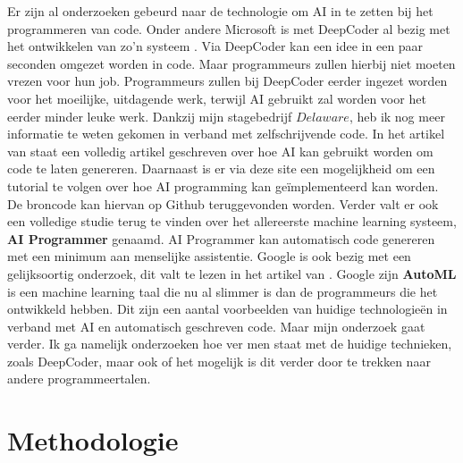 \documentclass[fleqn,10pt]{voorstel}
\begin{document}
Er zijn al onderzoeken gebeurd naar de technologie om AI in te zetten bij het programmeren van code. Onder andere Microsoft is met DeepCoder al bezig met het ontwikkelen van zo'n systeem \autocite{DeepCoder}. Via DeepCoder kan een idee in een paar seconden omgezet worden in code. Maar programmeurs zullen hierbij niet moeten vrezen voor hun job. Programmeurs zullen bij DeepCoder eerder ingezet worden voor het moeilijke, uitdagende werk, terwijl AI gebruikt zal worden voor het eerder minder leuke werk.
\break \break
Dankzij mijn stagebedrijf \(Delaware\), heb ik nog meer informatie te weten gekomen in verband met zelfschrijvende code. In het artikel van  \textcite{primaryObject} staat een volledig artikel geschreven over hoe AI kan gebruikt worden om code te laten genereren. Daarnaast is er via deze site een mogelijkheid om een tutorial te volgen over hoe AI programming kan geïmplementeerd kan worden. De broncode kan hiervan op Github \autocite{github} teruggevonden worden. Verder valt er ook een volledige studie \autocite{aiProgrammer} terug te vinden over het allereerste machine learning systeem, \textbf{AI Programmer} genaamd. AI Programmer kan automatisch code genereren met een minimum aan menselijke assistentie.
\break \break
Google is ook bezig met een gelijksoortig onderzoek, dit valt te lezen in het artikel van \textcite{green}. Google zijn \textbf{AutoML} is een machine learning taal die nu al slimmer is dan de programmeurs die het ontwikkeld hebben.
\break \break
Dit zijn een aantal voorbeelden van huidige technologieën in verband met AI en automatisch geschreven code. Maar mijn onderzoek gaat verder. Ik ga namelijk onderzoeken hoe ver men staat met de huidige technieken, zoals DeepCoder, maar ook of het mogelijk is dit verder door te trekken naar andere programmeertalen.





\section{Methodologie}
\label{sec:methodologie}
\end{document}
